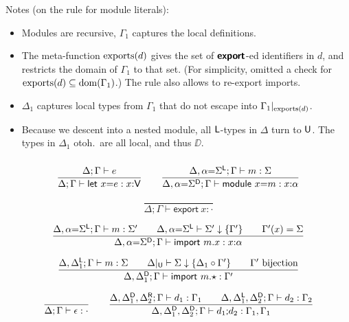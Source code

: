 \documentclass[10pt,a4paper]{article}
\newcommand\ff[1]{\ensuremath{\mathbin{\mathrm{#1\null}}}\xspace}
\newcommand\y[1]{\ensuremath{\mathsf{#1}}\xspace}
\newcommand\dom{\ff{dom}}
\newcommand\K[1]{\ensuremath{\textsf{#1}}}
\newcommand\KK[1]{\ensuremath{\K{\textbf{#1}}}}
\newcommand\note[1]{\noindent #1}
\begin{document}
\note{
Notes (on the rule for module literals):\\[-1.5\baselineskip]
\begin{itemize}
\item Modules are recursive, $\Gamma_1$ captures the local definitions.
\item The meta-function $\ff{exports}(d)$ gives the set of \KK{export}-ed identifiers in $d$, and restricts the domain of $\Gamma_1$ to that set.
(For simplicity, omitted a check for $\ff{exports}(d) \subseteq \dom(\Gamma_1)$.) The rule also allows to re-export imports.
\item $\Delta_1$ captures local types from $\Gamma_1$ that do not escape into $\Gamma_1|_{\ff{exports}(d)}$.
\item Because we descent into a nested module, all $\LL$-types in $\Delta$ turn to $\UU$. The types in $\Delta_1$ otoh.\ are all local, and thus $\DD$.
\end{itemize}
}


\subsubsection*{}

$$
\frac{
  \Delta; \Gamma \vdash e
}{
  \Delta; \Gamma \vdash \K{let}~x\K=e : x{:}\y{V}
}
\qquad
\frac{
  \Delta,\alpha{=}\Sigma^\LL; \Gamma \vdash m : \Sigma
}{
  \Delta,\alpha{=}\Sigma^\DD; \Gamma \vdash \K{module}~x\K=m : x{:}\alpha
}
$$

$$
\frac{
}{
  \Delta; \Gamma \vdash \K{export}~x : {\cdot}
}
$$

$$
\frac{
  \Delta,\alpha{=}\Sigma^\LL; \Gamma \vdash m : \Sigma'
  \qquad
  \Delta,\alpha{=}\Sigma^\LL \vdash \Sigma' \downarrow \{\Gamma'\}
  \qquad
  \Gamma'(x) = \Sigma
}{
  \Delta,\alpha{=}\Sigma^\DD; \Gamma \vdash \K{import}~m\K.x : x{:}\alpha
}
$$

$$
\frac{
  \Delta, \Delta_1^\LL; \Gamma \vdash m : \Sigma
  \qquad
  \Delta|_\UU \vdash \Sigma \downarrow \{\Delta_1\circ\Gamma'\}
  \qquad
  \Gamma' ~\mbox{bijection}
}{
  \Delta, \Delta_1^\DD; \Gamma \vdash \K{import}~m\K.{\star} : \Gamma'
}
$$

$$
\frac{
}{
  \Delta; \Gamma \vdash \epsilon : {\cdot}
}
\qquad
\frac{
  \Delta,\Delta_1^\DD,\Delta_2^\RR; \Gamma \vdash d_1 : \Gamma_1
  \qquad
  \Delta,\Delta_1^\LL,\Delta_2^\DD; \Gamma \vdash d_2 : \Gamma_2
}{
  \Delta,\Delta_1^\DD,\Delta_2^\DD; \Gamma \vdash d_1\K;d_2 : \Gamma_1,\Gamma_1
}
$$
\end{document}
